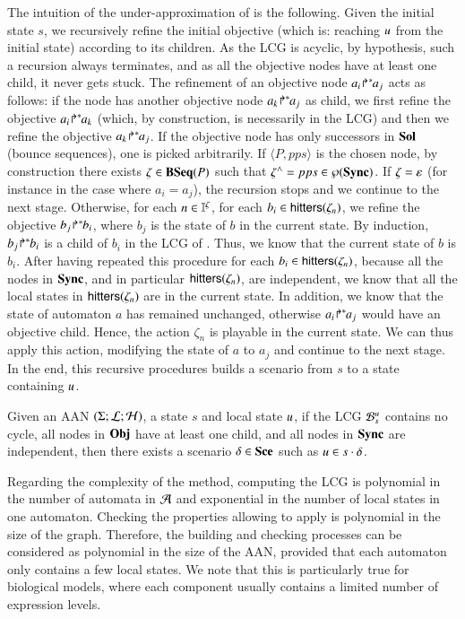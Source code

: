 The intuition of the under-approximation of  is the following.
Given the initial state $s$, we recursively refine the initial objective
(which is: reaching $u$ from the initial state) according to its children.
As the LCG is acyclic, by hypothesis, such a recursion always terminates, and as all the objective nodes have at
least one child, it never gets stuck.
The refinement of an objective node ${a_i\!\Rsh^*\!\!a_j}$ acts as follows:
if the node has another objective node ${a_k\!\Rsh^*\!\!a_j}$ as child, we first refine the objective
${a_i\!\Rsh^*\!\!a_k}$ (which, by construction, is necessarily in the LCG)
and then we refine the objective ${a_k\!\Rsh^*\!\!a_j}$.
If the objective node has only successors in $\mathbf{Sol}$ (bounce sequences), one is picked arbitrarily.
If $\langle P, pps\rangle$ is the chosen node,
by construction there exists $\zeta\in\mathbf{BSeq}(P)$ such that $\zeta^\wedge = pps \in \wp(\mathbf{Sync})$.
If $\zeta = \varepsilon$ (for instance in the case where $a_i = a_j$), the recursion stops and we
continue to the next stage.
Otherwise, for each $n\in\mathbb{I}^{\zeta}$,
for each $b_i \in\mathsf{hitters}(\zeta_n)$,
we refine the objective ${b_j\!\Rsh^*\!\!b_i}$, where $b_j$ is the state of $b$ in the current state.
By induction, ${b_j\!\Rsh^*\!\!b_i}$ is a child of $b_i$ in the LCG of .
Thus, we know that the current state of $b$ is $b_i$.
After having repeated this procedure for each $b_i\in\mathsf{hitters}(\zeta_n)$,
because all the nodes in $\mathbf{Sync}$, and in particular $\mathsf{hitters}(\zeta_n)$, are independent,
we know that all the local states in $\mathsf{hitters}(\zeta_n)$ are in the current state.
In addition, we know that the state of automaton $a$ has remained unchanged, otherwise
${a_i\!\Rsh^*\!\!a_j}$ would have an objective child.
Hence, the action $\zeta_n$ is playable in the current state.
We can thus apply this action, modifying the state of $a$ to $a_j$ and continue to the next stage.
In the end, this recursive procedures builds a scenario from $s$ to a state containing $u$.

\begin{theorem}
\label{th:approxinf}
  Given an AAN $(\Sigma; \mathcal{L}; \mathcal{H})$,
  a state $s$ and local state $u$,
  if the LCG ${\mathcal{B}_{s}^{u}}$ contains no cycle,
  all nodes in $\mathbf{Obj}$ have at least one child,
  and all nodes in $\mathbf{Sync}$ are independent,
  then there exists a scenario $\delta\in\mathbf{Sce}$ such as $u\in s\cdot\delta$.
\end{theorem}

Regarding the complexity of the method,
computing the LCG is polynomial in the number of automata in $\mathcal{A}$ and exponential in the number of local states in one automaton.
Checking the properties allowing to apply  is polynomial in the size of the graph.
Therefore, the building and checking processes can be considered as polynomial in the size
of the AAN, provided that each automaton only contains a few local states.
We note that this is particularly true for biological models, where
each component usually contains a limited number of expression levels.

